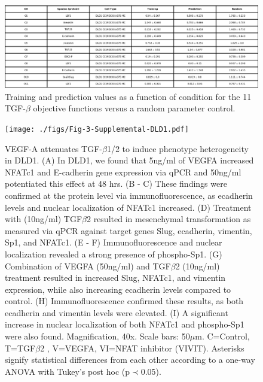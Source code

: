\begin{figure}
	\center
	\includegraphics [width=1.0\linewidth] {./figs/Fig-Supplemental-Error-Table.pdf}
	\caption{Training and prediction values as a function of condition for the 11 TGF-$\beta$ objective functions versus a random parameter control.}\label{fg:ObjTable}
\end{figure}

\begin{figure}
\texttt{[image: ./figs/Fig-3-Supplemental-DLD1.pdf]}
\caption{VEGF-A attenuates TGF-$\beta$1/2 to induce phenotype heterogeneity in DLD1.
(A) In DLD1, we found that 5ng/ml of VEGFA increased NFATc1 and E-cadherin gene expression via qPCR and 50ng/ml potentiated this effect at 48 hrs.
(B - C) These findings were confirmed at the protein level via immunofluorescence, as ecadherin levels and nuclear localization of NFATc1 increased.
(D) Treatment with (10ng/ml) TGF$\beta$2 resulted in mesenchymal transformation as measured via qPCR against target genes Slug, ecadherin, vimentin, Sp1, and NFATc1.
(E - F) Immunofluorescence and nuclear localization revealed a strong presence of phospho-Sp1.
(G) Combination of VEGFA (50ng/ml) and TGF$\beta$2 (10ng/ml) treatment resulted in increased Slug, NFATc1, and vimentin expression, while also increasing ecadherin levels compared to control.
(H) Immunofluorescence confirmed these results, as both ecadherin and vimentin levels were elevated.
(I) A significant increase in nuclear localization of both NFATc1 and phospho-Sp1 were also found.
Magnification, 40x. Scale bars: 50$\mu$m.  C=Control, T=TGF$\beta$2 , V=VEGFA, VI=NFAT inhibitor (VIVIT).
Asterisks signify statistical differences from each other according to a one-way ANOVA with Tukey's post hoc (p$\prec$0.05).}\label{fg:S3}
\end{figure}

